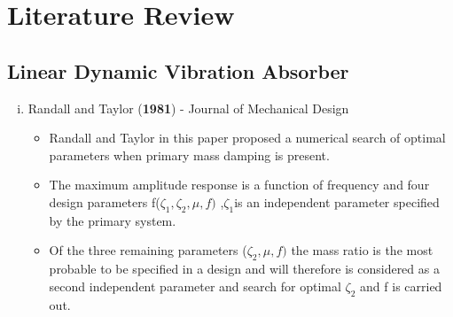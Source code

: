 %
\chapter{Literature Review}
\section{Linear Dynamic Vibration Absorber}
\begin{enumerate}[i)]
\item {Randall and Taylor (\textbf{1981}) - Journal of Mechanical Design}\\
\begin{itemize}
\item Randall and Taylor in this paper proposed a numerical search of optimal parameters when primary mass damping  is present.

\item The maximum amplitude response is a function of frequency and four design parameters f($\zeta_1, \zeta_2,\mu,f)$ ,$\zeta_1 $is an independent parameter specified by the primary system. 

\item Of the three remaining parameters ($\zeta_2,\mu,f)$ the mass ratio is the most probable to be specified in a design and will therefore is considered as a second independent parameter and search for optimal $\zeta_2 $ and f is carried out.


\end{itemize}
\end{enumerate}
